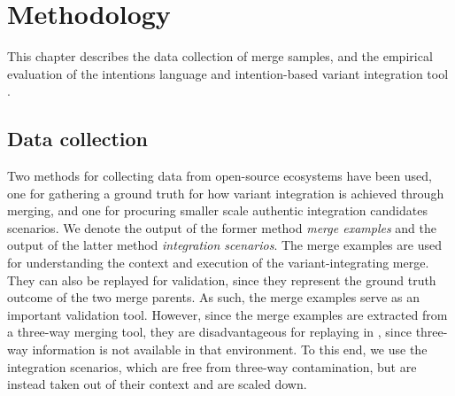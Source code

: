 \chapter{Methodology}
This chapter describes the data collection of merge samples, and the empirical evaluation of the intentions language and intention-based variant integration tool \tooln.

\section{Data collection}
Two methods for collecting data from open-source ecosystems have been used, one for gathering a ground truth for how variant integration is achieved through merging, and one for procuring smaller scale authentic integration candidates scenarios. We denote the output of the former method \textit{merge examples} and the output of the latter method \textit{integration scenarios}. The merge examples are used for understanding the context and execution of the variant-integrating merge. They can also be replayed for validation, since they represent the ground truth outcome of the two merge parents. As such, the merge examples serve as an important validation tool. However, since the merge examples are extracted from a three-way merging tool, they are disadvantageous for replaying in \tooln, since three-way information is not available in that environment. To this end, we use the integration scenarios, which are free from three-way contamination, but are instead taken out of their context and are scaled down.

